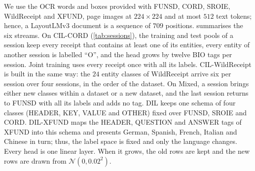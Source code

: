 We use the OCR words and boxes provided with FUNSD, CORD, SROIE, WildReceipt and XFUND, page images at $224{\times}224$ and at most $512$ text tokens; hence, a LayoutLMv3 document is a sequence of $709$ positions.  summarises the six streams. On CIL-CORD (\cref{tab:sessions}), the training and test pools of a session keep every receipt that contains at least one of its entities, every entity of another session is labelled ``O'', and the head grows by twelve BIO tags per session. Joint training uses every receipt once with all its labels. CIL-WildReceipt is built in the same way: the $24$ entity classes of WildReceipt arrive six per session over four sessions, in the order of the dataset. On Mixed, a session brings either new classes within a dataset or a new dataset, and the last session returns to FUNSD with all its labels and adds no tag. DIL keeps one schema of four classes (HEADER, KEY, VALUE and OTHER) fixed over FUNSD, SROIE and CORD. DIL-XFUND maps the HEADER, QUESTION and ANSWER tags of XFUND into this schema and presents German, Spanish, French, Italian and Chinese in turn; thus, the label space is fixed and only the language changes. Every head is one linear layer. When it grows, the old rows are kept and the new rows are drawn from $\mathcal{N}(0,0.02^2)$.

